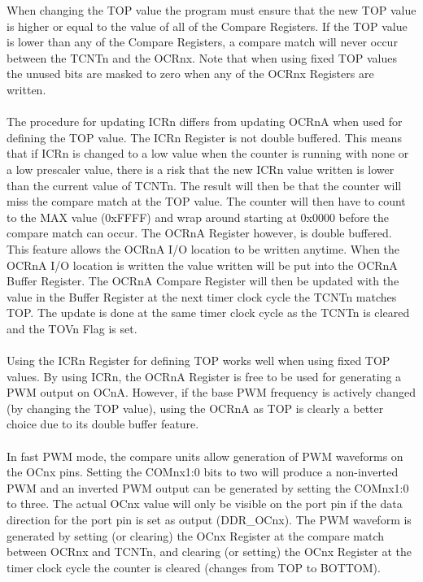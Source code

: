 \documentclass[english]{article}
\begin{document}
When changing the TOP value the program must ensure that the new TOP value is higher or
equal to the value of all of the Compare Registers. If the TOP value is lower than any of the
Compare Registers, a compare match will never occur between the TCNTn and the OCRnx. Note that when using fixed TOP values the unused bits are masked to zero when any of the OCRnx Registers are written.\\\\
The procedure for updating ICRn differs from updating OCRnA when used for defining the TOP value. The ICRn Register is not double buffered. This means that if ICRn is changed to a low value when the counter is running with none or a low prescaler value, there is a risk that the new ICRn value written is lower than the current value of TCNTn. The result will then be that the counter will miss the compare match at the TOP value. The counter will then have to count to the MAX value (0xFFFF) and wrap around starting at 0x0000 before the compare match can occur. The OCRnA Register however, is double buffered. This feature allows the OCRnA I/O location to be written anytime. When the OCRnA I/O location is written the value written will be put into the OCRnA Buffer Register. The OCRnA Compare Register will then be updated with the value in the Buffer Register at the next timer clock cycle the TCNTn matches TOP. The update is done at the same timer clock cycle as the TCNTn is cleared and the TOVn Flag is set.\\\\
Using the ICRn Register for defining TOP works well when using fixed TOP values. By using ICRn, the OCRnA Register is free to be used for generating a PWM output on OCnA. However, if the base PWM frequency is actively changed (by changing the TOP value), using the OCRnA as TOP is clearly a better choice due to its double buffer feature.\\\\
In fast PWM mode, the compare units allow generation of PWM waveforms on the OCnx pins. Setting the COMnx1:0 bits to two will produce a non-inverted PWM and an inverted PWM output can be generated by setting the COMnx1:0 to three. The actual OCnx value will only be visible on the port pin if the data direction for the port pin is set as output (DDR\_OCnx). The PWM waveform is generated by setting (or clearing) the OCnx Register at the compare match between OCRnx and TCNTn, and clearing (or setting) the OCnx Register at the timer clock cycle the counter is cleared (changes from TOP to BOTTOM).\\\\
\end{document}
